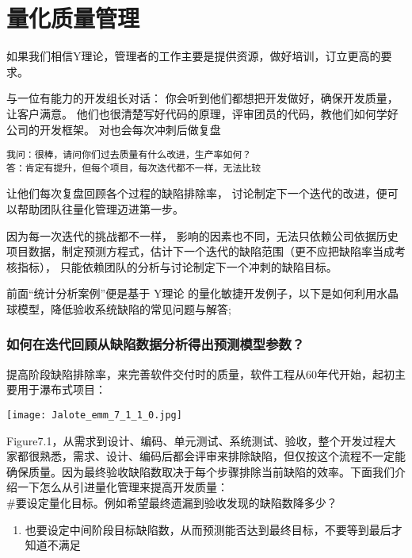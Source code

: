 
\chapter{量化质量管理} %

如果我们相信Y理论，管理者的工作主要是提供资源，做好培训，订立更高的要求。

与一位有能力的开发组长对话：
你会听到他们都想把开发做好，确保开发质量，让客户满意。
他们也很清楚写好代码的原理，评审团员的代码，教他们如何学好公司的开发框架。
对也会每次冲刺后做复盘

\texttt{我问：很棒，请问你们过去质量有什么改进，生产率如何？}\\
\texttt{答：肯定有提升，但每个项目，每次迭代都不一样，无法比较}

让他们每次复盘回顾各个过程的缺陷排除率，
讨论制定下一个迭代的改进，便可以帮助团队往量化管理迈进第一步。

因为每一次迭代的挑战都不一样，
影响的因素也不同，无法只依赖公司依据历史项目数据，制定预测方程式，估计下一个迭代的缺陷范围（更不应把缺陷率当成考核指标），
只能依赖团队的分析与讨论制定下一个冲刺的缺陷目标。

前面``统计分析案例''便是基于 Y理论
的量化敏捷开发例子，以下是如何利用水晶球模型，降低验收系统缺陷的常见问题与解答;


\hypertarget{ux5982ux4f55ux5728ux8fedux4ee3ux56deux987eux4eceux7f3aux9677ux6570ux636eux5206ux6790ux5f97ux51faux9884ux6d4bux6a21ux578bux53c2ux6570}{%
\subsection{如何在迭代回顾从缺陷数据分析得出预测模型参数？}\label{ux5982ux4f55ux5728ux8fedux4ee3ux56deux987eux4eceux7f3aux9677ux6570ux636eux5206ux6790ux5f97ux51faux9884ux6d4bux6a21ux578bux53c2ux6570}}

提高阶段缺陷排除率，来完善软件交付时的质量，软件工程从60年代开始，起初主要用于瀑布式项目：


\texttt{[image: Jalote\_emm\_7\_1\_1\_0.jpg]}

Figure7.1，从需求到设计、编码、单元测试、系统测试、验收，整个开发过程大家都很熟悉，需求、设计、编码后都会评审来排除缺陷，但仅按这个流程不一定能确保质量。因为最终验收缺陷数取决于每个步骤排除当前缺陷的效率。下面我们介绍一下怎么从引进量化管理来提高开发质量：\\
\#要设定量化目标。例如希望最终遗漏到验收发现的缺陷数降多少？

\begin{enumerate}
\tightlist
\item
  也要设定中间阶段目标缺陷数，从而预测能否达到最终目标，不要等到最后才知道不满足
\end{enumerate}

